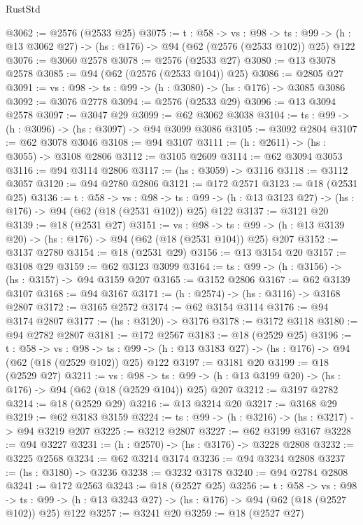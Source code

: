 \begin{lexlean}{RustStd}
\begin{coremodule}
{\begin{coremodule}
{{{{{{@3062 := @2576 (@2533 @25)
@3075 := {t : @58} ->
  {vs : @98} ->
  {ts : @99} -> (h : @13 @3062 @27) -> (hs : @176) -> @94 (@62 (@2576 (@2533 @102)) @25) @122
@3076 := @3060 @2578
@3078 := @2576 (@2533 @27)
@3080 := @13 @3078 @2578
@3085 := @94 (@62 (@2576 (@2533 @104)) @25)
@3086 := @2805 @27
@3091 := {vs : @98} -> {ts : @99} -> (h : @3080) -> (hs : @176) -> @3085 @3086
@3092 := @3076 @2778
@3094 := @2576 (@2533 @29)
@3096 := @13 @3094 @2578
@3097 := @3047 @29
@3099 := @62 @3062 @3038
@3104 := {ts : @99} -> (h : @3096) -> (hs : @3097) -> @94 @3099 @3086
@3105 := @3092 @2804
@3107 := @62 @3078 @3046
@3108 := @94 @3107
@3111 := (h : @2611) -> (hs : @3055) -> @3108 @2806
@3112 := @3105 @2609
@3114 := @62 @3094 @3053
@3116 := @94 @3114 @2806
@3117 := (hs : @3059) -> @3116
@3118 := @3112 @3057
@3120 := @94 @2780 @2806
@3121 := @172 @2571
@3123 := @18 (@2531 @25)
@3136 := {t : @58} ->
  {vs : @98} ->
  {ts : @99} -> (h : @13 @3123 @27) -> (hs : @176) -> @94 (@62 (@18 (@2531 @102)) @25) @122
@3137 := @3121 @20
@3139 := @18 (@2531 @27)
@3151 := {vs : @98} ->
  {ts : @99} -> (h : @13 @3139 @20) -> (hs : @176) -> @94 (@62 (@18 (@2531 @104)) @25) @207
@3152 := @3137 @2780
@3154 := @18 (@2531 @29)
@3156 := @13 @3154 @20
@3157 := @3108 @29
@3159 := @62 @3123 @3099
@3164 := {ts : @99} -> (h : @3156) -> (hs : @3157) -> @94 @3159 @207
@3165 := @3152 @2806
@3167 := @62 @3139 @3107
@3168 := @94 @3167
@3171 := (h : @2574) -> (hs : @3116) -> @3168 @2807
@3172 := @3165 @2572
@3174 := @62 @3154 @3114
@3176 := @94 @3174 @2807
@3177 := (hs : @3120) -> @3176
@3178 := @3172 @3118
@3180 := @94 @2782 @2807
@3181 := @172 @2567
@3183 := @18 (@2529 @25)
@3196 := {t : @58} ->
  {vs : @98} ->
  {ts : @99} -> (h : @13 @3183 @27) -> (hs : @176) -> @94 (@62 (@18 (@2529 @102)) @25) @122
@3197 := @3181 @20
@3199 := @18 (@2529 @27)
@3211 := {vs : @98} ->
  {ts : @99} -> (h : @13 @3199 @20) -> (hs : @176) -> @94 (@62 (@18 (@2529 @104)) @25) @207
@3212 := @3197 @2782
@3214 := @18 (@2529 @29)
@3216 := @13 @3214 @20
@3217 := @3168 @29
@3219 := @62 @3183 @3159
@3224 := {ts : @99} -> (h : @3216) -> (hs : @3217) -> @94 @3219 @207
@3225 := @3212 @2807
@3227 := @62 @3199 @3167
@3228 := @94 @3227
@3231 := (h : @2570) -> (hs : @3176) -> @3228 @2808
@3232 := @3225 @2568
@3234 := @62 @3214 @3174
@3236 := @94 @3234 @2808
@3237 := (hs : @3180) -> @3236
@3238 := @3232 @3178
@3240 := @94 @2784 @2808
@3241 := @172 @2563
@3243 := @18 (@2527 @25)
@3256 := {t : @58} ->
  {vs : @98} ->
  {ts : @99} -> (h : @13 @3243 @27) -> (hs : @176) -> @94 (@62 (@18 (@2527 @102)) @25) @122
@3257 := @3241 @20
@3259 := @18 (@2527 @27)
}}}}}}
\end{coremodule}}
\end{coremodule}
\end{lexlean}
